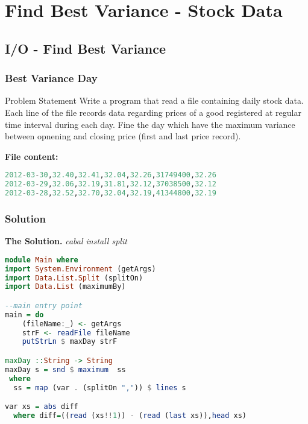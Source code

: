 \section{Find Best Variance - Stock Data}
\subsection{I/O - Find Best Variance}
\frame{\sectionpage}

\begin{frame}[fragile]\frametitle{Best Variance Day}

\begin{block}{Problem Statement}
Write a program that read a file containing daily stock data.
Each line of the file records data regarding prices of a good registered at
regular time interval during each day.
Fine the day which have the maximum variance between opnening and closing price
(first and last price record).
\end{block} 
\textbf{File content:}
\begin{lstlisting}[language=Haskell,basicstyle=\footnotesize\ttfamily]
2012-03-30,32.40,32.41,32.04,32.26,31749400,32.26
2012-03-29,32.06,32.19,31.81,32.12,37038500,32.12
2012-03-28,32.52,32.70,32.04,32.19,41344800,32.19
		\end{lstlisting}

\end{frame}


\begin{frame}[fragile]\frametitle{Solution}

\textbf{The Solution.} \textit{cabal install split}
\begin{lstlisting}[language=Haskell,basicstyle=\footnotesize\ttfamily]
module Main where
import System.Environment (getArgs)
import Data.List.Split (splitOn)
import Data.List (maximumBy)

--main entry point
main = do
	(fileName:_) <- getArgs 
	strF <- readFile fileName
	putStrLn $ maxDay strF	

maxDay ::String -> String
maxDay s = snd $ maximum  ss
 where 
  ss = map (var . (splitOn ",")) $ lines s

var xs = abs diff
  where diff=((read (xs!!1)) - (read (last xs)),head xs)
\end{lstlisting}


\end{frame}
